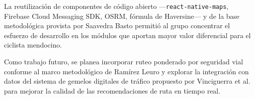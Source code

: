 \documentclass{llncs}
\begin{document}
La reutilización de componentes de código abierto —\texttt{react-native-maps}, Firebase Cloud Messaging SDK, OSRM, fórmula de Haversine— y de la base metodológica provista por Saavedra Basto \cite{Saavedra2022} permitió al grupo concentrar el esfuerzo de desarrollo en los módulos que aportan mayor valor diferencial para el ciclista mendocino.

Como trabajo futuro, se planea incorporar ruteo ponderado por seguridad vial conforme al marco metodológico de Ramírez Leuro \cite{Ramirez2021} y explorar la integración con datos del sistema de gemelos digitales de tráfico propuesto por Vinciguerra et al. \cite{Vinciguerra2025} para mejorar la calidad de las recomendaciones de ruta en tiempo real.



\end{document}
